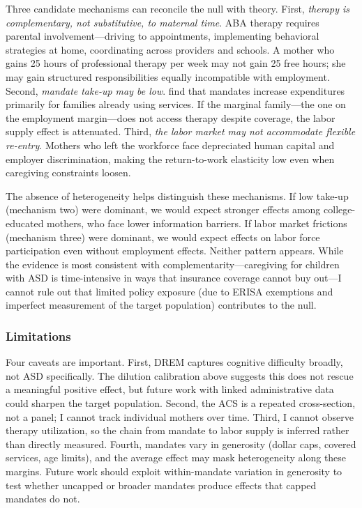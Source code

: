 \documentclass[12pt]{article}
\begin{document}
Three candidate mechanisms can reconcile the null with theory. First, \textit{therapy is complementary, not substitutive, to maternal time}. ABA therapy requires parental involvement---driving to appointments, implementing behavioral strategies at home, coordinating across providers and schools. A mother who gains 25 hours of professional therapy per week may not gain 25 free hours; she may gain structured responsibilities equally incompatible with employment. Second, \textit{mandate take-up may be low}. \citet{chatterji2015} find that mandates increase expenditures primarily for families already using services. If the marginal family---the one on the employment margin---does not access therapy despite coverage, the labor supply effect is attenuated. Third, \textit{the labor market may not accommodate flexible re-entry}. Mothers who left the workforce face depreciated human capital and employer discrimination, making the return-to-work elasticity low even when caregiving constraints loosen.

The absence of heterogeneity helps distinguish these mechanisms. If low take-up (mechanism two) were dominant, we would expect stronger effects among college-educated mothers, who face lower information barriers. If labor market frictions (mechanism three) were dominant, we would expect effects on labor force participation even without employment effects. Neither pattern appears. While the evidence is most consistent with complementarity---caregiving for children with ASD is time-intensive in ways that insurance coverage cannot buy out---I cannot rule out that limited policy exposure (due to ERISA exemptions and imperfect measurement of the target population) contributes to the null.

\subsubsection*{Limitations}  Four caveats are important. First, DREM captures cognitive difficulty broadly, not ASD specifically. The dilution calibration above suggests this does not rescue a meaningful positive effect, but future work with linked administrative data could sharpen the target population. Second, the ACS is a repeated cross-section, not a panel; I cannot track individual mothers over time. Third, I cannot observe therapy utilization, so the chain from mandate to labor supply is inferred rather than directly measured. Fourth, mandates vary in generosity (dollar caps, covered services, age limits), and the average effect may mask heterogeneity along these margins. Future work should exploit within-mandate variation in generosity to test whether uncapped or broader mandates produce effects that capped mandates do not.
\end{document}
